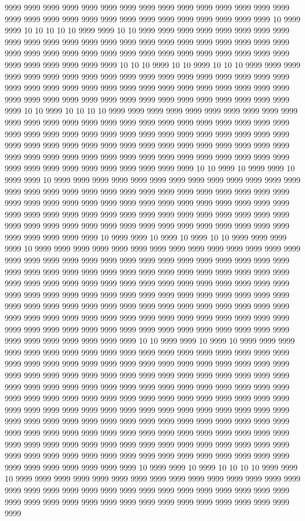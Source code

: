 9999 9999 9999 9999 9999 9999 9999 9999 9999 9999 9999 9999 9999 9999 9999 9999 9999 9999 9999 9999 9999 9999 9999 9999 9999 9999 9999 9999 9999 10 9999 9999 10 10 10 10 10 9999 9999 10 10 9999 9999 9999 9999 9999 9999 9999 9999 9999 9999 9999 9999 9999 9999 9999 9999 9999 9999 9999 9999 9999 9999 9999 9999 9999 9999 9999 9999 9999 9999 9999 9999 9999 9999 9999 9999 9999 9999 9999 9999 9999 9999 9999 9999 10 10 10 9999 10 10 9999 10 10 10 9999 9999 9999 9999 9999 9999 9999 9999 9999 9999 9999 9999 9999 9999 9999 9999 9999 9999 9999 9999 9999 9999 9999 9999 9999 9999 9999 9999 9999 9999 9999 9999 9999 9999 9999 9999 9999 9999 9999 9999 9999 9999 9999 9999 9999 9999 9999 9999 9999 10 10 9999 10 10 10 10 9999 9999 9999 9999 9999 9999 9999 9999 9999 9999 9999 9999 9999 9999 9999 9999 9999 9999 9999 9999 9999 9999 9999 9999 9999 9999 9999 9999 9999 9999 9999 9999 9999 9999 9999 9999 9999 9999 9999 9999 9999 9999 9999 9999 9999 9999 9999 9999 9999 9999 9999 9999 9999 9999 9999 9999 9999 9999 9999 9999 9999 9999 9999 9999 9999 9999 9999 9999 9999 9999 9999 9999 9999 9999 9999 9999 9999 9999 9999 9999 10 10 9999 10 9999 9999 10 9999 9999 10 9999 9999 9999 9999 9999 9999 9999 9999 9999 9999 9999 9999 9999 9999 9999 9999 9999 9999 9999 9999 9999 9999 9999 9999 9999 9999 9999 9999 9999 9999 9999 9999 9999 9999 9999 9999 9999 9999 9999 9999 9999 9999 9999 9999 9999 9999 9999 9999 9999 9999 9999 9999 9999 9999 9999 9999 9999 9999 9999 9999 9999 9999 9999 9999 9999 9999 9999 9999 9999 9999 9999 9999 9999 9999 9999 9999 9999 9999 10 9999 9999 10 9999 10 9999 10 10 9999 9999 9999 9999 10 9999 9999 9999 9999 9999 9999 9999 9999 9999 9999 9999 9999 9999 9999 9999 9999 9999 9999 9999 9999 9999 9999 9999 9999 9999 9999 9999 9999 9999 9999 9999 9999 9999 9999 9999 9999 9999 9999 9999 9999 9999 9999 9999 9999 9999 9999 9999 9999 9999 9999 9999 9999 9999 9999 9999 9999 9999 9999 9999 9999 9999 9999 9999 9999 9999 9999 9999 9999 9999 9999 9999 9999 9999 9999 9999 9999 9999 9999 9999 9999 9999 9999 9999 9999 9999 9999 9999 9999 9999 9999 9999 9999 9999 9999 9999 9999 9999 9999 9999 9999 9999 9999 9999 9999 9999 9999 9999 9999 9999 9999 9999 9999 9999 9999 9999 9999 9999 9999 9999 9999 9999 9999 9999 9999 9999 9999 10 10 9999 9999 10 9999 10 9999 9999 9999 9999 9999 9999 9999 9999 9999 9999 9999 9999 9999 9999 9999 9999 9999 9999 9999 9999 9999 9999 9999 9999 9999 9999 9999 9999 9999 9999 9999 9999 9999 9999 9999 9999 9999 9999 9999 9999 9999 9999 9999 9999 9999 9999 9999 9999 9999 9999 9999 9999 9999 9999 9999 9999 9999 9999 9999 9999 9999 9999 9999 9999 9999 9999 9999 9999 9999 9999 9999 9999 9999 9999 9999 9999 9999 9999 9999 9999 9999 9999 9999 9999 9999 9999 9999 9999 9999 9999 9999 9999 9999 9999 9999 9999 9999 9999 9999 9999 9999 9999 9999 9999 9999 9999 9999 9999 9999 9999 9999 9999 9999 9999 9999 9999 9999 9999 9999 9999 9999 9999 9999 9999 9999 9999 9999 9999 9999 9999 9999 9999 9999 9999 9999 9999 9999 9999 9999 9999 9999 9999 9999 9999 9999 9999 9999 9999 9999 9999 9999 9999 9999 9999 9999 9999 9999 9999 9999 9999 10 9999 9999 10 9999 10 10 10 10 9999 9999 10 9999 9999 9999 9999 9999 9999 9999 9999 9999 9999 9999 9999 9999 9999 9999 9999 9999 9999 9999 9999 9999 9999 9999 9999 9999 9999 9999 9999 9999 9999 9999 9999 9999 9999 9999 9999 9999 9999 9999 9999 9999 9999 9999 9999 9999 9999 